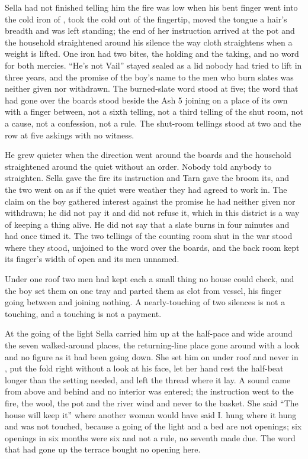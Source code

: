 Sella had not finished telling him the fire was low when his bent finger went into the cold iron of , took the cold out of the fingertip, moved the tongue a hair's breadth and was left standing; the end of her instruction arrived at the pot and the household straightened around his silence the way cloth straightens when a weight is lifted. One iron had two bites, the holding and the taking, and no  word for both mercies. “He's not Vail” stayed sealed as a lid nobody had tried to lift in three years, and the promise of the boy's name to the men who burn slates was neither given nor withdrawn. The burned-slate word stood at five; the word that had gone over the boards stood beside the Ash 5 joining on a place of its own with a finger between, not a sixth telling, not a third telling of the shut room, not a cause, not a confession, not a rule. The shut-room tellings stood at two and the row at five askings with no witness.

He grew quieter when the direction went around the boards and the household straightened around the quiet without an order. Nobody told anybody to straighten. Sella gave the fire its instruction and Tarn gave the broom its, and the two went on as if the quiet were weather they had agreed to work in. The claim on the boy gathered interest against the promise he had neither given nor withdrawn; he did not pay it and did not refuse it, which in this district is a way of keeping a thing alive. He did not say that a slate burns in four minutes and had once timed it. The two tellings of the counting room shut in the war stood where they stood, unjoined to the word over the boards, and the back room kept its finger's width of open and its men unnamed.

Under one roof two men had kept each a small thing no house could check, and the boy set them on one tray and parted them as clot from vessel, his finger going between and joining nothing. A nearly-touching of two silences is not a touching, and a touching is not a payment.

\scenebreak

At the going of the light Sella carried him up at the half-pace and wide around the seven walked-around places, the returning-line place gone around with a look and no figure as it had been going down. She set him on  under  roof and never in , put the fold right without a look at his face, let her hand rest the half-beat longer than the setting needed, and left the thread where it lay. A sound came from above and behind and no interior was entered; the instruction went to the fire, the wool, the pot and the river wind and never to the basket. She said “The house will keep it” where another woman would have said I.  hung where it hung and was not touched, because a going of the light and a bed are not openings; six openings in six months were six and not a rule, no seventh made due. The word that had gone up the terrace bought no opening here.

